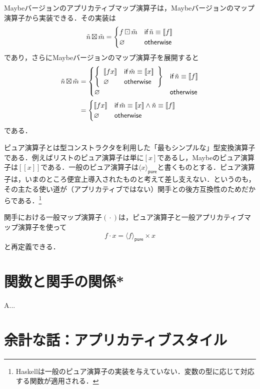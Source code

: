 \documentclass[a5paper,draft]{jsbook}
\def\[{\left[\!\left[}
\def\]{\right]\!\right]}
\newcommand{\programminglanguage}[1]{\textsf{#1}}
\newcommand{\haskell}{\programminglanguage{Haskell}}
\newcommand{\mathKeyword}[1]{\operatorname{\textsf{#1}}}
\newcommand{\mathIf}{\mathKeyword{if}}
\newcommand{\mathOtherwise}{\mathKeyword{otherwise}}
\DeclareMathOperator{\hsklApplicativeMap}{\times}
\DeclareMathOperator{\hsklApplicativeMaybeMap}{\boxtimes}
\DeclareMathOperator{\hsklFmap}{\cdot}
\DeclareMathOperator{\hsklMaybeMap}{\boxdot}
\newcommand{\hsklNothing}{\varnothing}
\newcommand{\hsklJust}[1]{\[#1\]}
\newcommand{\hsklPure}[1]{\langle#1\rangle_\textsf{pure}}
\newcommand{\hsklMaybe}[1]{\Tilde{#1}}
\begin{document}
Maybeバージョンのアプリカティブマップ演算子は，Maybeバージョンのマップ演算子から実装できる．その実装は
\begin{equation}
\hsklMaybe{n}\hsklApplicativeMaybeMap\hsklMaybe{m}=\begin{cases}
f\hsklMaybeMap\hsklMaybe{m}&\mathIf\hsklMaybe{n}\equiv\hsklJust{f}\\
\hsklNothing&\mathOtherwise
\end{cases}
\end{equation}
であり，さらにMaybeバージョンのマップ演算子を展開すると
\begin{align*}
\hsklMaybe{n}\hsklApplicativeMaybeMap\hsklMaybe{m}&=\begin{cases}
\left\{
\begin{array}{ll}
\hsklJust{fx}&\mathIf\hsklMaybe{m}\equiv\hsklJust{x}\\
\hsklNothing&\mathOtherwise
\end{array}\right\}&\mathIf\hsklMaybe{n}\equiv\hsklJust{f}\\
\hsklNothing&\mathOtherwise
\end{cases}\\
&=\begin{cases}
\hsklJust{fx}&\mathIf\hsklMaybe{m}\equiv\hsklJust{x}\wedge\hsklMaybe{n}\equiv\hsklJust{f}\\
\hsklNothing&\mathOtherwise
\end{cases}
\end{align*}
である．

ピュア演算子とは型コンストラクタを利用した「最もシンプルな」型変換演算子である．例えばリストのピュア演算子は単に$[x]$であるし，Maybeのピュア演算子は$\hsklJust{x}$である．一般のピュア演算子は$\hsklPure{x}$と書くものとする．ピュア演算子は，いまのところ便宜上導入されたものと考えて差し支えない．というのも，その主たる使い道が（アプリカティブではない）関手との後方互換性のためだからである．\footnote{\haskell は一般のピュア演算子の実装を与えていない．変数の型に応じて対応する関数が適用される．}

関手における一般マップ演算子$(\hsklFmap)$は，ピュア演算子と一般アプリカティブマップ演算子を使って$$f\hsklFmap x=\hsklPure{f}\hsklApplicativeMap x$$と再定義できる．

\section{関数と関手の関係*}

A...

\section{余計な話：アプリカティブスタイル}
\end{document}

